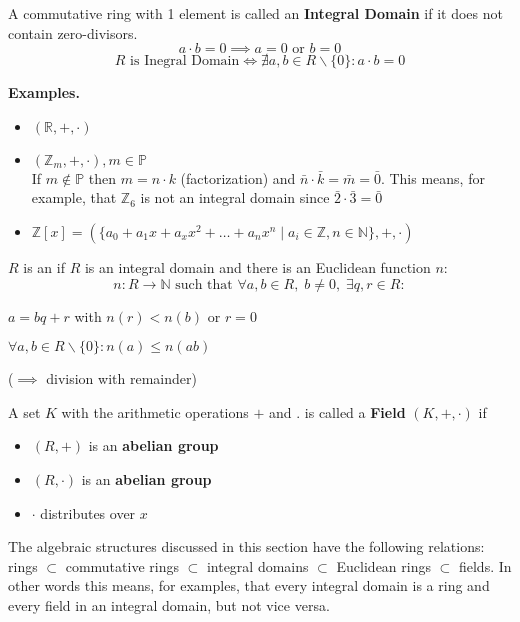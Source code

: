 \begin{definition}
A commutative ring with 1 element is called an \textbf{Integral Domain} if it does not contain zero-divisors.
\[a \cdot b = 0 \implies a=0 \text{ or } b=0\]
\[ R \text{ is Inegral Domain} \Leftrightarrow  \nexists a,b \in R \backslash \{0\}: a \cdot b = 0\]
\end{definition}

\textbf{Examples.}
\begin{itemize}
\item $(\mathbb{R}, +, \cdot)$
\item $(\mathbb{Z}_m, + , \cdot), m \in \mathbb{P}$ \\
If $m\not\in \mathbb{P}$ then $m = n \cdot k$ (factorization) and $\bar{n} \cdot \bar{k} = \bar{m} = \bar{0}$.
This means, for example, that $\mathbb{Z}_6$ is not an integral domain since $\bar{2} \cdot \bar{3} = \bar{0}$ \\
\item $\mathbb{Z}[x] = (\{a_0 + a_1 x + a_x x^2 + \ldots + a_n x^n \mid a_i \in \mathbb{Z}, n \in \mathbb{N} \},+,\cdot)$
\end{itemize}

\begin{definition}
$R$ is an  if $R$ is an integral domain and there is an Euclidean function $n$:
\[
  n : R \rightarrow \mathbb{N} \text{ such that } \forall a,b \in R,\; b \neq 0,\; \exists q,r \in R:
\]
	\begin{compactenum}
	\item $a = bq + r$ with $n(r) < n(b)$ or $r = 0$  
	\item $\forall a,b \in R \backslash \{0\} : n(a) \leq n(ab)$ 
	\end{compactenum}
	($\implies$ division with remainder) 
\end{definition}


\begin{definition}
A set $K$ with the arithmetic operations $+$ and $.$ is called a \textbf{Field} $(K,+,\cdot)$ if
\begin{itemize}
	\item $(R,+)$ is an \textbf{abelian group}
	\item $(R,\cdot)$ is an \textbf{abelian group}
	\item $\cdot$ distributes over $x$
\end{itemize}
\end{definition}

The algebraic structures discussed in this section have the following relations:
rings $\subset$ commutative rings $\subset$ integral domains $\subset$ Euclidean rings $\subset$ fields.
In other words this means, for examples, that every integral domain is a ring and every field in an integral domain, but not vice versa. 
